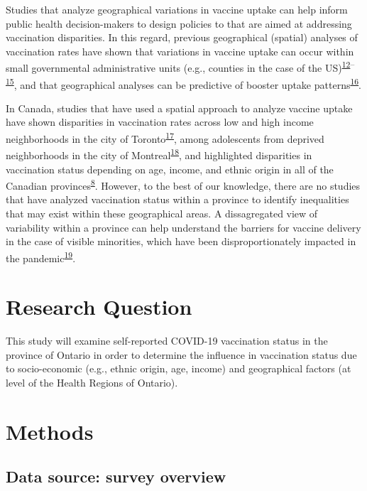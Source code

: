 \documentclass[
  letterpaper,
  DIV=11,
  numbers=noendperiod]{scrartcl}
\begin{document}
Studies that analyze geographical variations in vaccine uptake can help
inform public health decision-makers to design policies to that are
aimed at addressing vaccination disparities. In this regard, previous
geographical (spatial) analyses of vaccination rates have shown that
variations in vaccine uptake can occur within small governmental
administrative units (e.g., counties in the case of the
US)\textsuperscript{\protect\hyperlink{ref-mollalo2021}{12}--\protect\hyperlink{ref-bhuiyan2022}{15}},
and that geographical analyses can be predictive of booster uptake
patterns\textsuperscript{\protect\hyperlink{ref-wood2022}{16}}.

In Canada, studies that have used a spatial approach to analyze vaccine
uptake have shown disparities in vaccination rates across low and high
income neighborhoods in the city of
Toronto\textsuperscript{\protect\hyperlink{ref-choi2021}{17}}, among
adolescents from deprived neighborhoods in the city of
Montreal\textsuperscript{\protect\hyperlink{ref-mckinnon2021}{18}}, and
highlighted disparities in vaccination status depending on age, income,
and ethnic origin in all of the Canadian
provinces\textsuperscript{\protect\hyperlink{ref-guay2022}{8}}. However,
to the best of our knowledge, there are no studies that have analyzed
vaccination status within a province to identify inequalities that may
exist within these geographical areas. A dissagregated view of
variability within a province can help understand the barriers for
vaccine delivery in the case of visible minorities, which have been
disproportionately impacted in the
pandemic\textsuperscript{\protect\hyperlink{ref-hussain2022}{19}}.

\hypertarget{research-question}{%
\section{Research Question}\label{research-question}}

This study will examine self-reported COVID-19 vaccination status in the
province of Ontario in order to determine the influence in vaccination
status due to socio-economic (e.g., ethnic origin, age, income) and
geographical factors (at level of the Health Regions of Ontario).

\hypertarget{methods}{%
\section{Methods}\label{methods}}

\hypertarget{data-source-survey-overview}{%
\subsection{Data source: survey
overview}\label{data-source-survey-overview}}
\end{document}
